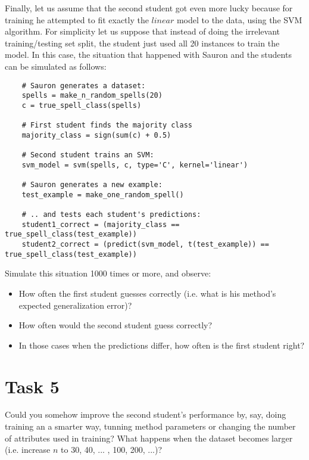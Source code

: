 \documentclass{article}
\begin{document}
Finally, let us assume that the second student got even more lucky because for training he attempted to fit exactly the $\textit{linear}$ model to the data, using the SVM algorithm. For simplicity let us suppose that instead of doing the irrelevant training/testing set split, the student just used all 20 instances to
train the model.
In this case, the situation that happened with Sauron and the students can be simulated as follows:
\begin{lstlisting}
    # Sauron generates a dataset:
    spells = make_n_random_spells(20)
    c = true_spell_class(spells)
    
    # First student finds the majority class
    majority_class = sign(sum(c) + 0.5)
    
    # Second student trains an SVM:
    svm_model = svm(spells, c, type='C', kernel='linear')

    # Sauron generates a new example:
    test_example = make_one_random_spell()
    
    # .. and tests each student's predictions:
    student1_correct = (majority_class == true_spell_class(test_example))
    student2_correct = (predict(svm_model, t(test_example)) == true_spell_class(test_example))
\end{lstlisting}
Simulate this situation 1000 times or more, and observe:
\begin{itemize}
\item How often the first student guesses correctly (i.e. what is his method's expected generalization error)?
\item How often would the second student guess correctly?
\item In those cases when the predictions differ, how often is the first student right?
\end{itemize}
\section*{Task 5}
Could you somehow improve the second student's performance by, say, doing training an a smarter way, tunning method parameters or changing the number of attributes used in training? What happens when the dataset becomes larger (i.e. increase  $\textit{n}$ to 30, 40, ... , 100, 200, ...)?
\end{document}
